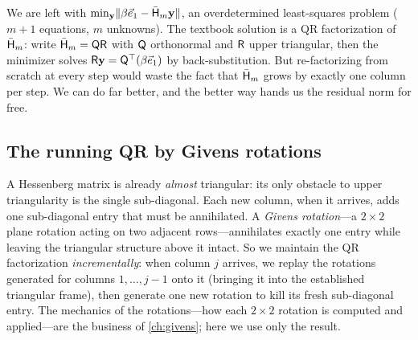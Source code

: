 We are left with $\min_{\mathbf{y}}\lVert\beta\vec e_1-\bar{\mathsf{H}}_m\mathbf{y}\rVert$, an
overdetermined least-squares problem ($m{+}1$ equations, $m$ unknowns). The
textbook solution is a QR factorization of $\bar{\mathsf{H}}_m$: write
$\bar{\mathsf{H}}_m=\mathsf{Q}\mathsf{R}$ with $\mathsf{Q}$ orthonormal and $\mathsf{R}$ upper
triangular, then the minimizer solves $\mathsf{R}\mathbf{y}=\mathsf{Q}^{\top}(\beta\vec e_1)$ by
back-substitution. But re-factorizing from scratch at every step would waste the
fact that $\bar{\mathsf{H}}_m$ grows by exactly one column per step. We can do far
better, and the better way hands us the residual norm for free.

\subsection{The running QR by Givens rotations}

A Hessenberg matrix is already \emph{almost} triangular: its only obstacle to upper
triangularity is the single sub-diagonal. Each new column, when it arrives, adds one
sub-diagonal entry that must be annihilated. A \emph{Givens rotation}---a $2\times2$
plane rotation acting on two adjacent rows---annihilates exactly one entry while
leaving the triangular structure above it intact. So we maintain the QR factorization
\emph{incrementally}: when column $j$ arrives, we replay the rotations generated for
columns $1,\dots,j-1$ onto it (bringing it into the established triangular frame),
then generate one new rotation to kill its fresh sub-diagonal entry. The mechanics of
the rotations---how each $2\times2$ rotation is computed and applied---are the
business of \cref{ch:givens}; here we use only the result.

